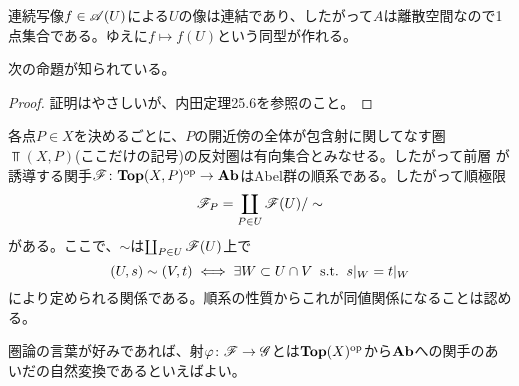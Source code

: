 \begin{rem}
  連続写像$f \in \mathscr{A} (U)$による$U$の像は連結であり、したがって$A$は離散空間なので1点集合である。ゆえに$f \mapsto f(U)$という同型が作れる。
\end{rem}




\begin{rem}
次の命題が知られている。
  \begin{proof}
    証明はやさしいが、内田\cite{内田}定理25.6を参照のこと。
  \end{proof}
\end{rem}




\begin{rem}
  各点$P \in X$を決めるごとに、$P$の開近傍の全体が包含射に関してなす圏$\Top(X,P)$(ここだけの記号)の反対圏は有向集合とみなせる。したがって前層
  が誘導する関手$\mathscr{F} \colon \textbf{Top}(X,P)^{\text{op}} \to \textbf{Ab}$はAbel群の順系である。したがって順極限
  \[
  \mathscr{F}_P = \coprod_{P \in U } \mathscr{F}(U) / \sim
  \]
  がある。ここで、$\sim$は$ \coprod_{P \in U } \mathscr{F}(U)$上で
  \[
(U,s) \sim (V,t) \iff  \exists W \subset U \cap V \; \; \text{s.t.} \; \; s|_W = t|_W
  \]
  により定められる関係である。順系の性質からこれが同値関係になることは認める。
\end{rem}



\begin{rem}
  圏論の言葉が好みであれば、射${\varphi} \colon \mathscr{F} \to \mathscr{G}$とは$\textbf{Top}(X)^{\text{op}}$から$\textbf{Ab}$への関手のあいだの自然変換であるといえばよい。
\end{rem}





